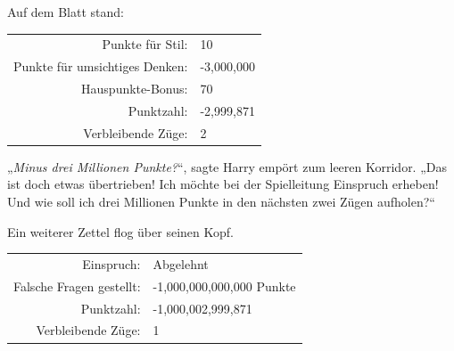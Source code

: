 Auf dem Blatt stand:
\begin{writtenNote}
\begin{tabular}{rl}
Punkte für Stil: & 10\\
Punkte für umsichtiges Denken: & -3,000,000\\
Hauspunkte-Bonus: & 70\\
Punktzahl: & -2,999,871\\
Verbleibende Züge: & 2
\end{tabular}
\end{writtenNote}%

„\emph{Minus drei Millionen Punkte?}“, sagte Harry empört zum leeren Korridor.
„Das ist doch etwas übertrieben! Ich möchte bei der Spielleitung Einspruch erheben! Und wie soll ich drei Millionen Punkte in den nächsten zwei Zügen aufholen?“

Ein weiterer Zettel flog über seinen Kopf.
\begin{writtenNote}
\begin{tabular}{rl}
Einspruch: & Abgelehnt\\
Falsche Fragen gestellt: & -1,000,000,000,000 Punkte\\
Punktzahl: & -1,000,002,999,871\\
Verbleibende Züge: & 1
\end{tabular}
\end{writtenNote}

